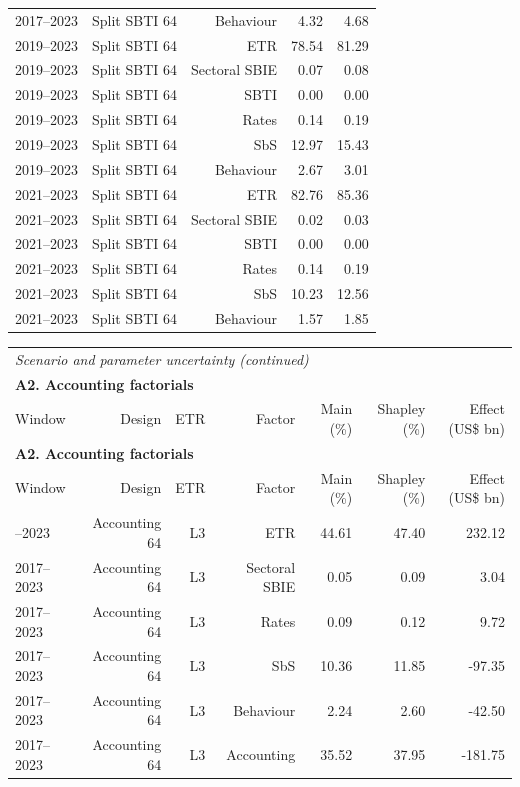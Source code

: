 {\begin{longtable}{@{}lrrrr@{}}
2017–2023 & Split SBTI 64 & Behaviour &  4.32 &  4.68 \\
2019–2023 & Split SBTI 64 & ETR & 78.54 & 81.29 \\
2019–2023 & Split SBTI 64 & Sectoral SBIE &  0.07 &  0.08 \\
2019–2023 & Split SBTI 64 & SBTI &  0.00 &  0.00 \\
2019–2023 & Split SBTI 64 & Rates &  0.14 &  0.19 \\
2019–2023 & Split SBTI 64 & SbS & 12.97 & 15.43 \\
2019–2023 & Split SBTI 64 & Behaviour &  2.67 &  3.01 \\
2021–2023 & Split SBTI 64 & ETR & 82.76 & 85.36 \\
2021–2023 & Split SBTI 64 & Sectoral SBIE &  0.02 &  0.03 \\
2021–2023 & Split SBTI 64 & SBTI &  0.00 &  0.00 \\
2021–2023 & Split SBTI 64 & Rates &  0.14 &  0.19 \\
2021–2023 & Split SBTI 64 & SbS & 10.23 & 12.56 \\
2021–2023 & Split SBTI 64 & Behaviour &  1.57 &  1.85 \\
\end{longtable}
\addtocounter{table}{-1}
\begin{longtable}{@{}lrrrrrr@{}}
\multicolumn{7}{l}{\textit{Scenario and parameter uncertainty (continued)}} \\
\multicolumn{7}{l}{\textbf{A2. Accounting factorials}} \\
\toprule
Window & Design & ETR & Factor & Main (\%) & Shapley (\%) & Effect (US\$ bn) \\
\midrule
\endfirsthead
\multicolumn{7}{l}{\textbf{A2. Accounting factorials}} \\
\toprule
Window & Design & ETR & Factor & Main (\%) & Shapley (\%) & Effect (US\$ bn) \\
\midrule
\endhead
\midrule
\endfoot
\bottomrule
\endlastfoot
2017–2023 & Accounting 64 & L3 & ETR & 44.61 & 47.40 &  232.12 \\
2017–2023 & Accounting 64 & L3 & Sectoral SBIE &  0.05 &  0.09 &    3.04 \\
2017–2023 & Accounting 64 & L3 & Rates &  0.09 &  0.12 &    9.72 \\
2017–2023 & Accounting 64 & L3 & SbS & 10.36 & 11.85 &  -97.35 \\
2017–2023 & Accounting 64 & L3 & Behaviour &  2.24 &  2.60 &  -42.50 \\
2017–2023 & Accounting 64 & L3 & Accounting & 35.52 & 37.95 & -181.75 \\

\end{longtable}}
